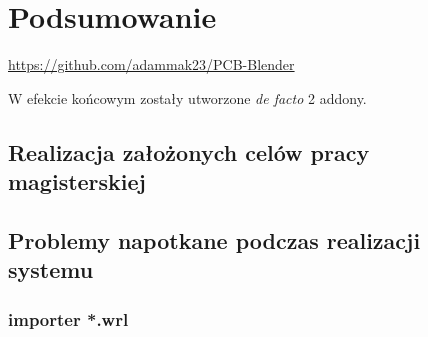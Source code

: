 \documentclass[brudnopis]{xmgr}
\begin{document}

\chapter{Podsumowanie}

\url{https://github.com/adammak23/PCB-Blender}

W efekcie końcowym zostały utworzone \emph{de facto} 2 addony.

\section{Realizacja założonych celów pracy magisterskiej}
\section {Problemy napotkane podczas realizacji systemu}
\subsection {importer *.wrl}
\end{document}
